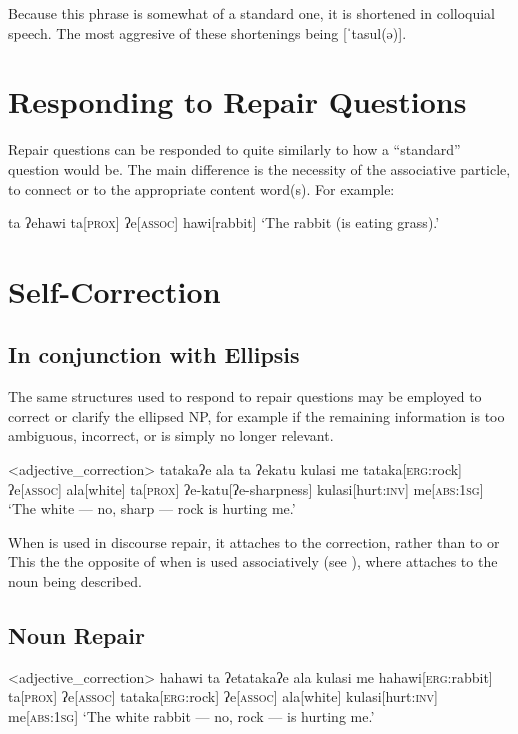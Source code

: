 Because this phrase is somewhat of a standard one, it is shortened in colloquial speech. The most aggresive of these shortenings being [ˈtasul(ə)].

\section{Responding to Repair Questions}\label{sec:repair_response}

Repair questions can be responded to quite similarly to how a ``standard'' question would be. The main difference is the necessity of the associative particle,  to connect  or  to the appropriate content word(s). For example:

\ex
\begingl
\glpreamble ta ʔehawi
\endpreamble
ta[\textsc{prox}]
ʔe[\textsc{assoc}]
hawi[rabbit]
\glft `The rabbit (is eating grass).'
\endgl
\xe
\section{Self-Correction}
\subsection{In conjunction with  Ellipsis}

The same structures used to respond to repair questions may be employed to correct or clarify the ellipsed NP, for example if the remaining information is too ambiguous, incorrect, or is simply no longer relevant.

\ex<adjective_correction>
\begingl
\glpreamble tatakaʔe ala ta ʔekatu kulasi me
\endpreamble
tataka[\textsc{erg:}rock]
ʔe[\textsc{assoc}]
ala[white]
ta[\textsc{prox}]
ʔe-katu[ʔe-sharpness]
kulasi[hurt\textsc{:inv}]
me[\textsc{abs:1sg}]
\glft `The white --- no, sharp --- rock is hurting me.'
\endgl
\xe

When  is used in discourse repair, it attaches to the correction, rather than to  or  This the the opposite of when  is used associatively (see ), where  attaches to the noun being described.


\subsection{Noun Repair}
\ex<adjective_correction>
\begingl
\glpreamble hahawi ta ʔetatakaʔe ala kulasi me
\endpreamble
hahawi[\textsc{erg:}rabbit]
ta[\textsc{prox}]
ʔe[\textsc{assoc}]
tataka[\textsc{erg:}rock]
ʔe[\textsc{assoc}]
ala[white]
kulasi[hurt\textsc{:inv}]
me[\textsc{abs:1sg}]
\glft `The white rabbit --- no, rock ---  is hurting me.'
\endgl
\xe

